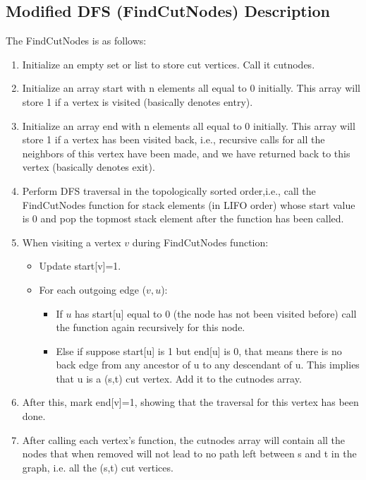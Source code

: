 \documentclass{article}
\begin{document}
    \subsection{Modified DFS (FindCutNodes) Description}
    The FindCutNodes is as follows:
        \begin{enumerate}
            \item Initialize an empty set or list to store cut vertices. Call it cutnodes.
            \item Initialize an array start with n elements all equal to 0 initially. This array will store 1 if a vertex is visited (basically denotes entry).
            \item Initialize an array end with n elements all equal to 0 initially. This array will store 1 if a vertex has been visited back, i.e., recursive calls for all the neighbors of this vertex have been made, and we have returned back to this vertex (basically denotes exit).
            \item Perform DFS traversal in the topologically sorted order,i.e., call the FindCutNodes function for stack elements (in LIFO order) whose start value is 0 and pop the topmost stack element after the function has been called.
            \item When visiting a vertex $v$ during FindCutNodes function:
            \begin{itemize}
                \item Update start[v]=1.
                \item For each outgoing edge ($v, u$):
                \begin{itemize}
                    \item If $u$ has start[u] equal to 0 (the node has not been visited before) call the function again recursively for this node.
                    \item Else if suppose start[u] is 1 but end[u] is 0, that means there is no back edge from any ancestor of u to any descendant of u. This implies that u is a (s,t) cut vertex. Add it to the cutnodes array.
                \end{itemize}
            \end{itemize}
            \item After this, mark end[v]=1, showing that the traversal for this vertex has been done.
            \item After calling each vertex's function, the cutnodes array will contain all the nodes that when removed will not lead to no path left between s and t in the graph, i.e. all the (s,t) cut vertices.
        \end{enumerate}
\end{document}
